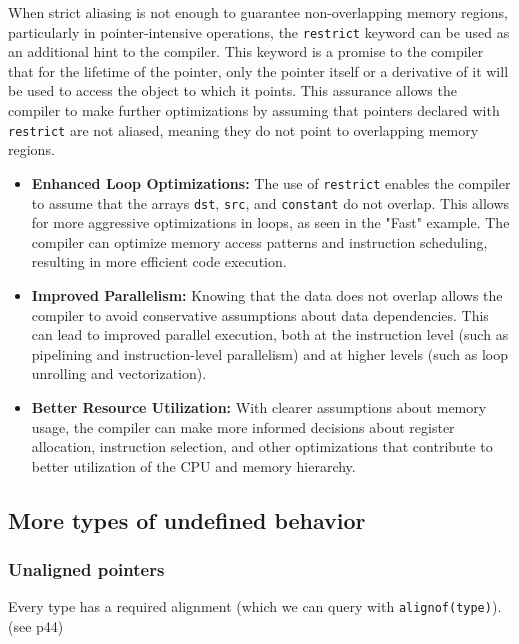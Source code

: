 \documentclass[12pt]{article}
\begin{document}
When strict aliasing is not enough to guarantee non-overlapping memory regions, particularly in pointer-intensive operations, the \texttt{restrict} keyword can be used as an additional hint to the compiler. This keyword is a promise to the compiler that for the lifetime of the pointer, only the pointer itself or a derivative of it will be used to access the object to which it points. This assurance allows the compiler to make further optimizations by assuming that pointers declared with \texttt{restrict} are not aliased, meaning they do not point to overlapping memory regions.

\begin{itemize}
    \item \textbf{Enhanced Loop Optimizations:} The use of \texttt{restrict} enables the compiler to assume that the arrays \texttt{dst}, \texttt{src}, and \texttt{constant} do not overlap. This allows for more aggressive optimizations in loops, as seen in the "Fast" example. The compiler can optimize memory access patterns and instruction scheduling, resulting in more efficient code execution.
    
    \item \textbf{Improved Parallelism:} Knowing that the data does not overlap allows the compiler to avoid conservative assumptions about data dependencies. This can lead to improved parallel execution, both at the instruction level (such as pipelining and instruction-level parallelism) and at higher levels (such as loop unrolling and vectorization).
    
    \item \textbf{Better Resource Utilization:} With clearer assumptions about memory usage, the compiler can make more informed decisions about register allocation, instruction selection, and other optimizations that contribute to better utilization of the CPU and memory hierarchy.
\end{itemize}

\subsection{More types of undefined behavior}

\subsubsection{Unaligned pointers}

Every type has a required alignment (which we can query with \texttt{alignof(type)}). (see p44)
\end{document}

